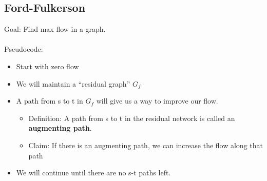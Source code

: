 \documentclass[12pt]{article}
\begin{document}
\subsection*{Ford-Fulkerson}
Goal: Find max flow in a graph.
\\\\
Pseudocode:
\begin{itemize}
    \item Start with zero flow
    \item We will maintain a “residual graph” $G_f$
    \item A path from s to t in $G_f$ will give us a way to improve our flow.
    \begin{itemize}
     \item Definition: A path from s to t in the residual network is called an \textbf{augmenting path}.
    \item Claim: If there is an augmenting path, we can increase the flow along that path
    \end{itemize}
    \item We will continue until there are no s-t paths left.
\end{itemize}
\end{document}
